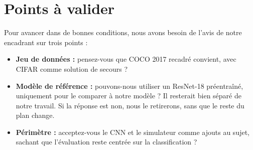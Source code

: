 \section{Points à valider}
\label{sec:validation}

Pour avancer dans de bonnes conditions, nous avons besoin de l'avis de notre encadrant sur trois points :

\begin{itemize}[label=$\square$]
  \item \textbf{Jeu de données :} pensez-vous que COCO 2017 recadré convient, avec CIFAR comme solution de secours ?
  \item \textbf{Modèle de référence :} pouvons-nous utiliser un ResNet-18 préentraîné, uniquement pour le comparer à notre modèle ? Il resterait bien séparé de notre travail. Si la réponse est non, nous le retirerons, sans que le reste du plan change.
  \item \textbf{Périmètre :} acceptez-vous le CNN et le simulateur comme ajouts au sujet, sachant que l'évaluation reste centrée sur la classification ?
\end{itemize}
